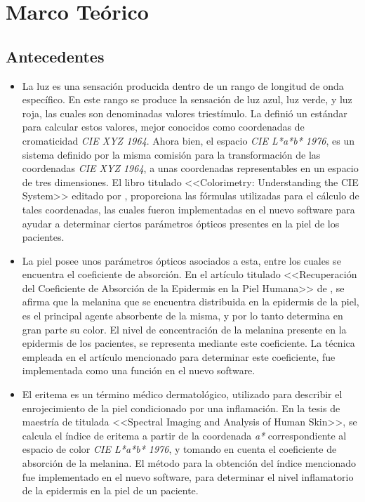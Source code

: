 \chapter{\label{cap:2}Marco Te\'{o}rico}

	\section{Antecedentes}	
		\begin{itemize}
		
			\item
				La luz es una sensaci\'{o}n producida dentro de un rango de longitud de onda espec\'{i}fico. En este rango se produce la sensaci\'{o}n de luz azul, luz verde, y luz roja, las cuales son denominadas valores triest\'{i}mulo. La \cite{CIE} defini\'{o} un est\'{a}ndar para calcular estos valores, mejor conocidos como coordenadas de cromaticidad \textit{CIE XYZ 1964}. Ahora bien, el espacio \textit{CIE L*a*b* 1976}, es un sistema definido por la misma comisi\'{o}n para la \mbox{transformaci\'{o}n} de las coordenadas \textit{CIE XYZ 1964}, a unas coordenadas representables en un espacio de tres dimensiones. El libro titulado <<Colorimetry: Understanding the CIE System>> editado por \cite{Schanda}, proporciona las f\'{o}rmulas utilizadas para el c\'{a}lculo de tales coordenadas, las cuales fueron implementadas en el nuevo software para ayudar a determinar ciertos par\'{a}metros \'{o}pticos presentes en la piel de los pacientes.
			
			\item La piel posee unos par\'{a}metros \'{o}pticos asociados a esta, entre los cuales se encuentra el coeficiente de absorci\'{o}n. En el art\'{i}culo titulado <<Recuperaci\'{o}n del Coeficiente de Absorci\'{o}n de la Epidermis en la Piel Humana>> de \cite{Narea}, se afirma que la melanina que se encuentra distribuida en la epidermis de la piel, es el  principal agente absorbente de la misma, y por lo tanto determina en gran parte su color. El nivel de concentraci\'{o}n de la melanina presente en la epidermis de los pacientes, se representa mediante este coeficiente. La t\'{e}cnica empleada en el art\'{i}culo mencionado para determinar este coeficiente, fue implementada como una funci\'{o}n en el nuevo software.
			
			\item El eritema es un t\'{e}rmino m\'{e}dico dermatol\'{o}gico, utilizado para describir el enrojecimiento de la piel condicionado por una inflamaci\'{o}n. En la tesis de maestr\'{i}a de \cite{Bersha} titulada <<Spectral Imaging and Analysis of Human Skin>>, se calcula el \'{i}ndice de eritema a partir de la coordenada \textit{a*} correspondiente al espacio de color \textit{CIE L*a*b* 1976}, y tomando en cuenta el coeficiente de absorci\'{o}n de la melanina. El m\'{e}todo para la obtenci\'{o}n del \'{i}ndice mencionado fue implementado en el nuevo software, para determinar el nivel inflamatorio de la epidermis en la piel de un paciente.
		\end{itemize}

